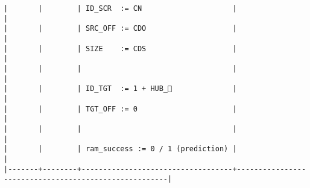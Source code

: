 \documentclass[varwidth=\maxdimen,margin=0.5cm,multi={verbatim}]{standalone}
\begin{document}
\begin{verbatim}
|       |        | ID_SCR  := CN                     |                                                      |
|       |        | SRC_OFF := CDO                    |                                                      |
|       |        | SIZE    := CDS                    |                                                      |
|       |        |                                   |                                                      |
|       |        | ID_TGT  := 1 + HUB_              |                                                      |
|       |        | TGT_OFF := 0                      |                                                      |
|       |        |                                   |                                                      |
|       |        | ram_success := 0 / 1 (prediction) |                                                      |
|-------+--------+-----------------------------------+------------------------------------------------------|
\end{verbatim}
\end{document}
